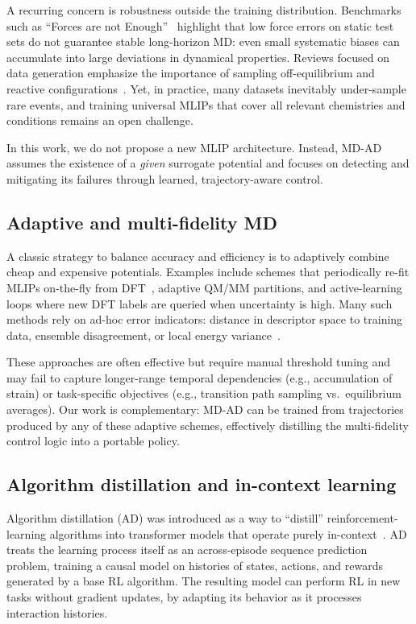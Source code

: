 \documentclass{article}
\begin{document}
A recurring concern is robustness outside the training distribution. Benchmarks such as ``Forces are not Enough''~\cite{fu2022forcesnot} highlight that low force errors on static test sets do not guarantee stable long-horizon MD: even small systematic biases can accumulate into large deviations in dynamical properties. Reviews focused on data generation emphasize the importance of sampling off-equilibrium and reactive configurations~\cite{kulichenko2024datagen}. Yet, in practice, many datasets inevitably under-sample rare events, and training universal MLIPs that cover all relevant chemistries and conditions remains an open challenge.

In this work, we do not propose a new MLIP architecture. Instead, MD-AD assumes the existence of a \emph{given} surrogate potential and focuses on detecting and mitigating its failures through learned, trajectory-aware control.

\subsection{Adaptive and multi-fidelity MD}

A classic strategy to balance accuracy and efficiency is to adaptively combine cheap and expensive potentials. Examples include schemes that periodically re-fit MLIPs on-the-fly from DFT~\cite{kulichenko2024datagen}, adaptive QM/MM partitions, and active-learning loops where new DFT labels are queried when uncertainty is high. Many such methods rely on ad-hoc error indicators: distance in descriptor space to training data, ensemble disagreement, or local energy variance~\cite{kulichenko2024datagen,stocker2022forcesnotenough}. 

These approaches are often effective but require manual threshold tuning and may fail to capture longer-range temporal dependencies (e.g., accumulation of strain) or task-specific objectives (e.g., transition path sampling vs.\ equilibrium averages). Our work is complementary: MD-AD can be trained from trajectories produced by any of these adaptive schemes, effectively distilling the multi-fidelity control logic into a portable policy.

\subsection{Algorithm distillation and in-context learning}

Algorithm distillation (AD) was introduced as a way to ``distill'' reinforcement-learning algorithms into transformer models that operate purely in-context~\cite{laskin2022algorithmdistillation}. AD treats the learning process itself as an across-episode sequence prediction problem, training a causal model on histories of states, actions, and rewards generated by a base RL algorithm. The resulting model can perform RL in new tasks without gradient updates, by adapting its behavior as it processes interaction histories.
\end{document}
